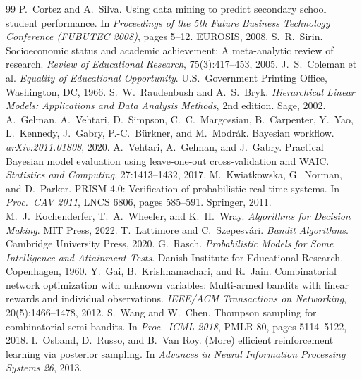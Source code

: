 \documentclass[10pt,a4paper]{article}
\begin{document}
\clearpage
\begin{thebibliography}{99}\small
{} P.\ Cortez and A.\ Silva. Using data mining to predict secondary school student performance. In \emph{Proceedings of the 5th Future Business Technology Conference (FUBUTEC 2008)}, pages 5--12. EUROSIS, 2008.
 S.\ R.\ Sirin. Socioeconomic status and academic achievement: A meta-analytic review of research. \emph{Review of Educational Research}, 75(3):417--453, 2005.
 J.\ S.\ Coleman et al. \emph{Equality of Educational Opportunity}. U.S.\ Government Printing Office, Washington, DC, 1966.
 S.\ W.\ Raudenbush and A.\ S.\ Bryk. \emph{Hierarchical Linear Models: Applications and Data Analysis Methods}, 2nd edition. Sage, 2002.
 A.\ Gelman, A.\ Vehtari, D.\ Simpson, C.\ C.\ Margossian, B.\ Carpenter, Y.\ Yao, L.\ Kennedy, J.\ Gabry, P.-C.\ B\"urkner, and M.\ Modr\'ak. Bayesian workflow. \emph{arXiv:2011.01808}, 2020.
 A.\ Vehtari, A.\ Gelman, and J.\ Gabry. Practical Bayesian model evaluation using leave-one-out cross-validation and WAIC. \emph{Statistics and Computing}, 27:1413--1432, 2017.
 M.\ Kwiatkowska, G.\ Norman, and D.\ Parker. PRISM 4.0: Verification of probabilistic real-time systems. In \emph{Proc.\ CAV 2011}, LNCS 6806, pages 585--591. Springer, 2011.
 M.\ J.\ Kochenderfer, T.\ A.\ Wheeler, and K.\ H.\ Wray. \emph{Algorithms for Decision Making}. MIT Press, 2022.
 T.\ Lattimore and C.\ Szepesv\'ari. \emph{Bandit Algorithms}. Cambridge University Press, 2020.
 G.\ Rasch. \emph{Probabilistic Models for Some Intelligence and Attainment Tests}. Danish Institute for Educational Research, Copenhagen, 1960.
 Y.\ Gai, B.\ Krishnamachari, and R.\ Jain. Combinatorial network optimization with unknown variables: Multi-armed bandits with linear rewards and individual observations. \emph{IEEE/ACM Transactions on Networking}, 20(5):1466--1478, 2012.
 S.\ Wang and W.\ Chen. Thompson sampling for combinatorial semi-bandits. In \emph{Proc.\ ICML 2018}, PMLR 80, pages 5114--5122, 2018.
 I.\ Osband, D.\ Russo, and B.\ Van Roy. (More) efficient reinforcement learning via posterior sampling. In \emph{Advances in Neural Information Processing Systems 26}, 2013.
\end{thebibliography}
\end{document}

